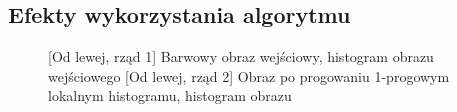 \documentclass[a4paper,12pt, titlepage]{report}
\begin{document}
\subsection*{Efekty wykorzystania algorytmu}
\begin{figure}[h]
    \centering
    \qquad
    \caption{[Od lewej, rząd 1] Barwowy obraz wejściowy, histogram obrazu wejściowego [Od lewej, rząd 2] Obraz po progowaniu 1-progowym lokalnym histogramu, histogram obrazu}%
    \label{fig:rysunek}%
\end{figure}
\end{document}
